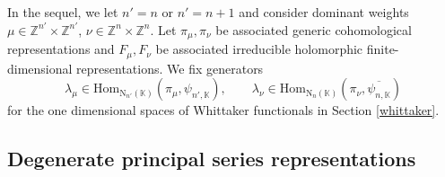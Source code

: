 \documentclass[12pt, a4paper]{amsart}
\newcommand{\RN}{{\mathrm {N}}}
\newcommand{\Z}{\mathbb{Z}}
\newcommand{\K}{\mathbb{K}}
\theoremstyle{Theorem}
\theoremstyle{Theorem}
\theoremstyle{Theorem}
\theoremstyle{Theorem}
\theoremstyle{Plain}
\theoremstyle{Definition}
\begin{document}
	In the sequel, we let $n'=n$ or $n'=n+1$ and consider dominant weights $\mu\in\Z^{n'}\times\Z^{n'}$, $\nu\in\Z^{n}\times\Z^{n}$. Let $\pi_{\mu},\pi_{\nu}$ be associated generic cohomological representations and  $F_{\mu},F_{\nu}$ be associated irreducible holomorphic finite-dimensional representations. We fix generators
	\[
	\lambda_{\mu}\in\mathrm{Hom}_{\RN_{n'}(\K)}(\pi_{\mu},\psi_{n',\K}),\qquad\lambda_{\nu}\in\mathrm{Hom}_{\RN_{n}(\K)}(\pi_{\nu},\overline{\psi_{n,\K}})
	\]
	for the one dimensional spaces of Whittaker functionals in Section \ref{whittaker}.
	
	
	\subsection{Degenerate principal series representations}
	
\end{document}
